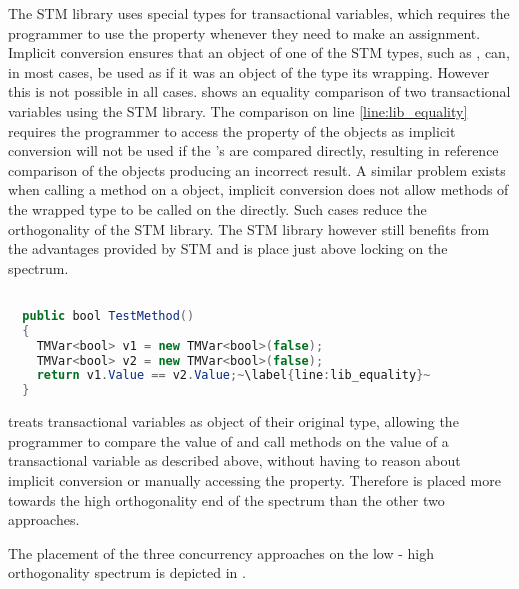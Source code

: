 The \ac{STM} library uses special types for transactional variables, which requires the programmer to use the  property whenever they need to make an assignment. Implicit conversion ensures that an object of one of the \ac{STM} types, such as , can, in most cases, be used as if it was an object of the type its wrapping. However this is not possible in all cases.  shows an equality comparison of two transactional variables using the \ac{STM} library. The comparison on line \ref{line:lib_equality} requires the programmer to access the  property of the  objects as implicit conversion will not be used if the 's are compared directly, resulting in reference comparison of the  objects producing an incorrect result. A similar problem exists when calling a method on a  object, implicit conversion does not allow methods of the wrapped type to be called on the  directly. Such cases reduce the orthogonality of the \ac{STM} library. The \ac{STM} library however still benefits from the advantages provided by \ac{STM} and is place just above locking on the spectrum.

\begin{lstlisting}[label=lst:lib_implicit_conversion,
  caption={Equality comparison of \bscode{TMVar<bool>}},
  language=Java,  
  showspaces=false,
  showtabs=false,
  breaklines=true,
  showstringspaces=false,
  breakatwhitespace=true,
  escapechar=~,
  commentstyle=\color{greencomments},
  keywordstyle=\color{bluekeywords},
  stringstyle=\color{redstrings},
  morekeywords={atomic, retry, orelse, var, get, set, ref, out, bool}]  % Start your code-block

  public bool TestMethod()
  {
    TMVar<bool> v1 = new TMVar<bool>(false);
    TMVar<bool> v2 = new TMVar<bool>(false);
    return v1.Value == v2.Value;~\label{line:lib_equality}~
  }
\end{lstlisting}
\stmnamesp treats transactional variables as object of their original type, allowing the programmer to compare the value of and call methods on  the value of a transactional variable as described above, without having to reason about implicit conversion or manually accessing the  property. Therefore \stmname is placed more towards the high orthogonality end of the spectrum than the other two approaches. 

The placement of the three concurrency approaches on the low - high orthogonality spectrum is depicted in .


